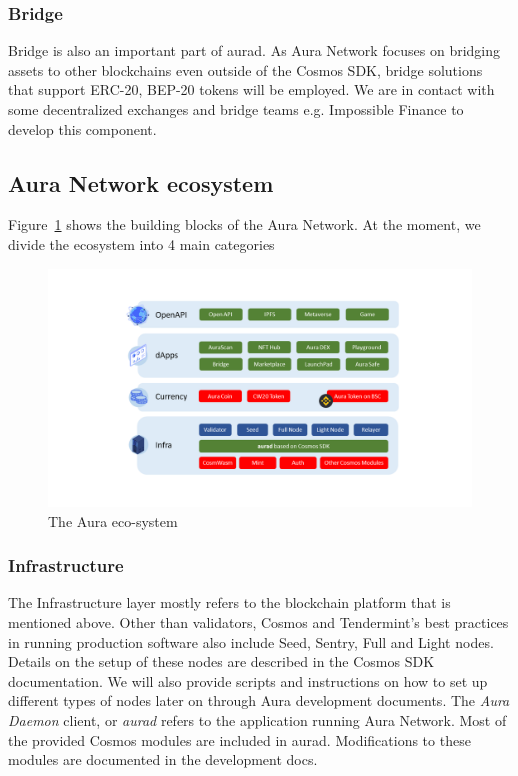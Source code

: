 \documentclass[11pt, titlepage]{article}
\begin{document}
\subsubsection*{Bridge}
Bridge is also an important part of aurad. As Aura Network focuses on bridging assets to other blockchains even outside of the Cosmos SDK, bridge solutions that support ERC-20, BEP-20 tokens will be employed. We are in contact with some decentralized exchanges and bridge teams e.g. Impossible Finance to develop this component. 

\subsection{Aura Network ecosystem}
Figure~\ref{fig:auraeco} shows the building blocks of the Aura Network. At the moment, we divide the ecosystem into 4 main categories

\begin{figure}[ht]
\label{fig:auraeco}
\includegraphics[width=18cm, trim={5cm 3cm 0cm 2cm}]{img/auraeco.png}
\centering
\caption{The Aura eco-system}
\end{figure}

\subsubsection*{Infrastructure}
The Infrastructure layer mostly refers to the blockchain platform that is mentioned above. Other than validators, Cosmos and Tendermint's best practices in running production software also include Seed, Sentry, Full and Light nodes. Details on the setup of these nodes are described in the Cosmos SDK documentation. We will also provide scripts and instructions on how to set up different types of nodes later on through Aura development documents. The \emph{Aura Daemon} client, or \emph{aurad} refers to the application running Aura Network.
Most of the provided Cosmos modules are included in aurad. Modifications to these modules are documented in the development docs.
\end{document}
